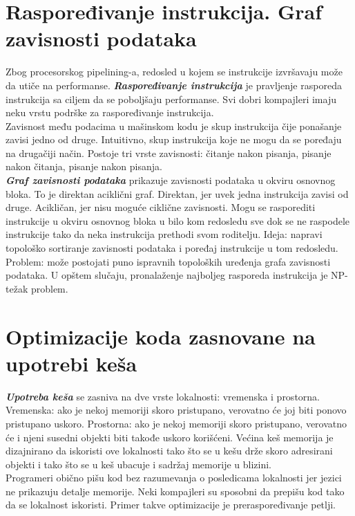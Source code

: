 \documentclass[10pt]{extarticle}
\begin{document}
\section{Raspoređivanje instrukcija. Graf zavisnosti podataka}
\noindent
Zbog procesorskog pipelining-a, redosled u kojem se instrukcije izvršavaju može da utiče na performanse. \textit{\textbf{Raspoređivanje instrukcija}} je pravljenje rasporeda instrukcija sa ciljem da se poboljšaju performanse. Svi dobri kompajleri imaju neku vrstu podrške za raspoređivanje instrukcija.\\
Zavisnost među podacima u mašinskom kodu je skup instrukcija čije ponašanje zavisi jedno od druge. Intuitivno, skup instrukcija koje ne mogu da se poređaju na drugačiji način. Postoje tri vrste zavisnosti: čitanje nakon pisanja, pisanje nakon čitanja, pisanje nakon pisanja.\\
\textit{\textbf{Graf zavisnosti podataka}} prikazuje zavisnosti podataka u okviru osnovnog bloka. To je direktan aciklični graf. Direktan, jer uvek jedna instrukcija zavisi od druge. Acikličan, jer nisu moguće ciklične zavisnosti. Mogu se rasporediti instrukcije u okviru osnovnog bloka u bilo kom redosledu sve dok se ne raspodele instrukcije tako da neka instrukcija prethodi svom roditelju. Ideja: napravi topološko sortiranje zavisnosti podataka i poređaj instrukcije u tom redosledu.\\
Problem: može postojati puno ispravnih topoloških uređenja grafa zavisnosti podataka. U opštem slučaju, pronalaženje najboljeg rasporeda instrukcija je NP-težak problem.

\section{Optimizacije koda zasnovane na upotrebi keša}
\noindent
\textit{\textbf{Upotreba keša}} se zasniva na dve vrste lokalnosti: vremenska i prostorna. Vremenska: ako je nekoj memoriji skoro pristupano, verovatno će joj biti ponovo pristupano uskoro. Prostorna: ako je nekoj memoriji skoro pristupano, verovatno će i njeni susedni objekti biti takođe uskoro korišćeni. Većina keš memorija je dizajnirano da iskoristi ove lokalnosti tako što se u kešu drže skoro adresirani objekti i tako što se u keš ubacuje i sadržaj memorije u blizini.\\
Programeri obično pišu kod bez razumevanja o posledicama lokalnosti jer jezici ne prikazuju detalje memorije. Neki kompajleri su sposobni da prepišu kod tako da se lokalnost iskoristi. Primer takve optimizacije je preraspoređivanje petlji.
\end{document}
